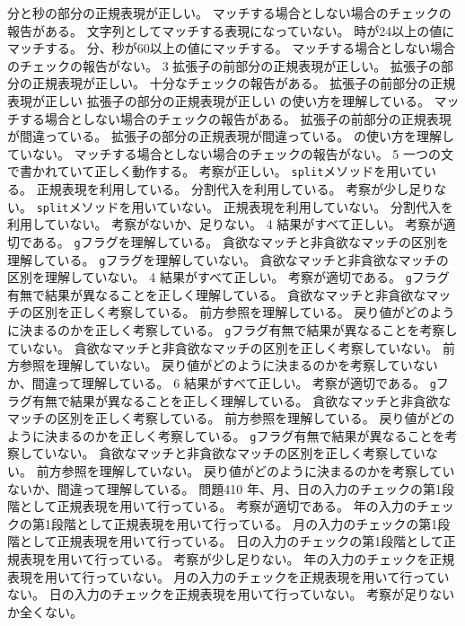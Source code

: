 {{	{分と秒の部分の正規表現が正しい。}
	{マッチする場合としない場合のチェックの報告がある。}
	}
	{
  {文字列としてマッチする表現になっていない。}
	{時が24以上の値にマッチする。}
	{分、秒が60以上の値にマッチする。}
	{マッチする場合としない場合のチェックの報告がない。}
	}
	{}{3}
	{
	{拡張子の前部分の正規表現が正しい。}
	{拡張子の部分の正規表現が正しい。}
	{十分なチェックの報告がある。}
	}
	{
	{拡張子の前部分の正規表現が正しい}
	{拡張子の部分の正規表現が正しい}
	{{\bfseries\textdollar}の使い方を理解している。}
	{マッチする場合としない場合のチェックの報告がある。}
	}
	{
	{拡張子の前部分の正規表現が間違っている。}
	{拡張子の部分の正規表現が間違っている。}
	{{\bfseries\textdollar}の使い方を理解していない。}
	{マッチする場合としない場合のチェックの報告がない。}
	}
	{}{5}
	{
	{一つの文で書かれていて正しく動作する。}
	{考察が正しい。}
	}
	{
	{\texttt{split}メソッドを用いている。}
	{正規表現を利用している。}
	{分割代入を利用している。}
	{考察が少し足りない。}
	}
	{
	{\texttt{split}メソッドを用いていない。}
	{正規表現を利用していない。}
	{分割代入を利用していない。}
	{考察がないか、足りない。}
	}
	{}{4}
	{
	{結果がすべて正しい。}
  {考察が適切である。}
	}
	{
	{\texttt{g}フラグを理解している。}
  {貪欲なマッチと非貪欲なマッチの区別を理解している。}
	}
	{
	{\texttt{g}フラグを理解していない。}
  {貪欲なマッチと非貪欲なマッチの区別を理解していない。}
	}
	{}{4}
	{
	{結果がすべて正しい。}
  {考察が適切である。}
	}
	{
	{\texttt{g}フラグ有無で結果が異なることを正しく理解している。}
  {貪欲なマッチと非貪欲なマッチの区別を正しく考察している。}
  {前方参照を理解している。}
  {戻り値がどのように決まるのかを正しく考察している。}
	}
	{
	{\texttt{g}フラグ有無で結果が異なることを考察していない。}
  {貪欲なマッチと非貪欲なマッチの区別を正しく考察していない。}
  {前方参照を理解していない。}
  {戻り値がどのように決まるのかを考察していないか、間違って理解している。}
	}
	{}{6}
	{
	{結果がすべて正しい。}
  {考察が適切である。}
	}
	{
	{\texttt{g}フラグ有無で結果が異なることを正しく理解している。}
  {貪欲なマッチと非貪欲なマッチの区別を正しく考察している。}
  {前方参照を理解している。}
  {戻り値がどのように決まるのかを正しく考察している。}
	}
	{
	{\texttt{g}フラグ有無で結果が異なることを考察していない。}
  {貪欲なマッチと非貪欲なマッチの区別を正しく考察していない。}
  {前方参照を理解していない。}
  {戻り値がどのように決まるのかを考察していないか、間違って理解している。}
	}
	{問題4}{10}
	{
	{年、月、日の入力のチェックの第1段階として正規表現を用いて行っている。}
  {考察が適切である。}
	}
	{
	{年の入力のチェックの第1段階として正規表現を用いて行っている。}
	{月の入力のチェックの第1段階として正規表現を用いて行っている。}
	{日の入力のチェックの第1段階として正規表現を用いて行っている。}
  {考察が少し足りない。}
	}
	{
	{年の入力のチェックを正規表現を用いて行っていない。}
	{月の入力のチェックを正規表現を用いて行っていない。}
	{日の入力のチェックを正規表現を用いて行っていない。}
  {考察が足りないか全くない。}
	}
}